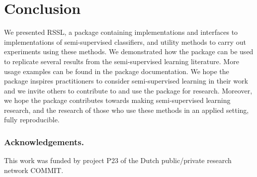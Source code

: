 \documentclass[runningheads,a4paper]{llncs}\usepackage[]{graphicx}\usepackage[]{color}
\begin{document}
\section{Conclusion}
We presented RSSL, a package containing implementations and interfaces to implementations of semi-supervised classifiers, and utility methods to carry out experiments using these methods. We demonstrated how the package can be used to replicate several results from the semi-supervised learning literature. More usage examples can be found in the package documentation. We hope the package inspires practitioners to consider semi-supervised learning in their work and we invite others to contribute to and use the package for research. Moreover, we hope the package contributes towards making semi-supervised learning research, and the research of those who use these methods in an applied setting, fully reproducible.

\subsubsection*{Acknowledgements.}
This work was funded by project P23 of the Dutch public/private research network COMMIT.



\end{document}
